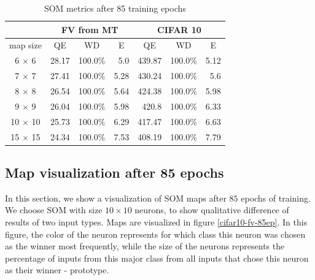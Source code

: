 \begin{table}[h!]
\centering
\begin{tabular}{|c|rrr|rrr|}
\hline
\multicolumn{1}{|l|}{} & \multicolumn{3}{c|}{FV from MT}                                              & \multicolumn{3}{c|}{CIFAR 10}                                            \\ \hline
\multicolumn{1}{|c|}{map size} & \multicolumn{1}{c|}{QE} & \multicolumn{1}{c|}{WD} & \multicolumn{1}{c|}{E} & \multicolumn{1}{c|}{QE} & \multicolumn{1}{c|}{WD} & \multicolumn{1}{c|}{E} \\ \hline
6 $\times$ 6& \multicolumn{1}{r|}{28.17}   & \multicolumn{1}{r|}{100.0\%}   &  5.0 & \multicolumn{1}{r|}{439.87} & \multicolumn{1}{r|}{100.0\%} &  5.12 \\ \hline
7 $\times$ 7& \multicolumn{1}{r|}{27.41}   & \multicolumn{1}{r|}{100.0\%}   &  5.28 & \multicolumn{1}{r|}{430.24} & \multicolumn{1}{r|}{100.0\%} &  5.6 \\ \hline
8 $\times$ 8& \multicolumn{1}{r|}{26.54}   & \multicolumn{1}{r|}{100.0\%}   &  5.64 & \multicolumn{1}{r|}{424.38} & \multicolumn{1}{r|}{100.0\%} &  5.98 \\ \hline
9 $\times$ 9& \multicolumn{1}{r|}{26.04}   & \multicolumn{1}{r|}{100.0\%}   &  5.98 & \multicolumn{1}{r|}{420.8} & \multicolumn{1}{r|}{100.0\%} &  6.33 \\ \hline
10 $\times$ 10& \multicolumn{1}{r|}{25.73}   & \multicolumn{1}{r|}{100.0\%}   &  6.29 & \multicolumn{1}{r|}{417.47} & \multicolumn{1}{r|}{100.0\%} &  6.63 \\ \hline
15 $\times$ 15& \multicolumn{1}{r|}{24.34}   & \multicolumn{1}{r|}{100.0\%}   &  7.53 & \multicolumn{1}{r|}{408.19} & \multicolumn{1}{r|}{100.0\%} &  7.79 \\ \hline

\end{tabular}
\caption{SOM metrics after 85 training epochs}
\label{tab:som-metrices-85ep}
\end{table}

\subsection{Map visualization after 85 epochs}
In this section, we show a visualization of SOM maps after $85$ epochs of training. We choose SOM with size $10\times10$ neurons, to show qualitative difference of results of two input types. Maps are visualized in figure \ref{cifar10-fv-85ep}. In this figure, the color of the neuron represents for which class this neuron was chosen as the winner most frequently, while the size of the neurons represents the percentage of inputs from this major class from all inputs that chose this neuron as their winner - prototype.

